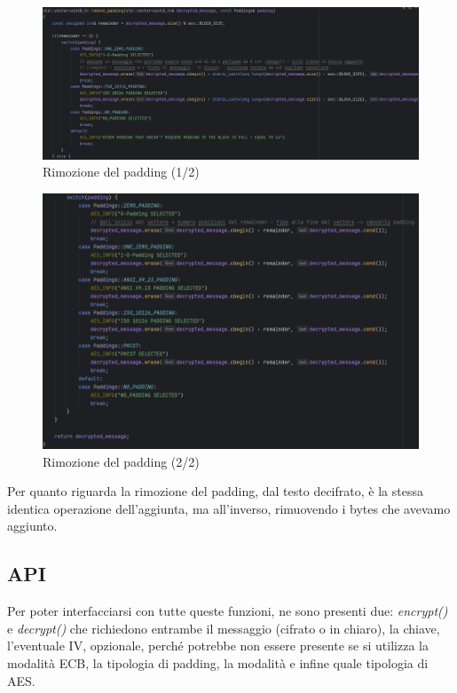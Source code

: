\begin{figure}[H]
	\centering
	\includegraphics[width=1\textwidth, height=1\textheight, keepaspectratio]{./images/code/cpp/padding/remove_padding0.PNG}
	\caption{Rimozione del padding (1/2)}
	\label{fig:remove_padding0}
\end{figure}

\begin{figure}[H]
	\centering
	\includegraphics[width=1\textwidth, height=1\textheight, keepaspectratio]{./images/code/cpp/padding/remove_padding1.PNG}
	\caption{Rimozione del padding (2/2)}
	\label{fig:remove_padding1}
\end{figure}

\textsf{\small Per quanto riguarda la rimozione del padding, dal testo decifrato, è la stessa identica operazione dell'aggiunta, ma all'inverso, rimuovendo i bytes che avevamo aggiunto.} %

\subsection{API}

\textsf{\small Per poter interfacciarsi con tutte queste funzioni, ne sono presenti due: \emph{encrypt()} e \emph{decrypt()} che richiedono entrambe il messaggio (cifrato o in chiaro), la chiave, l'eventuale IV, opzionale, perché potrebbe non essere presente se si utilizza la modalità ECB, la tipologia di padding, la modalità e infine quale tipologia di AES.}

